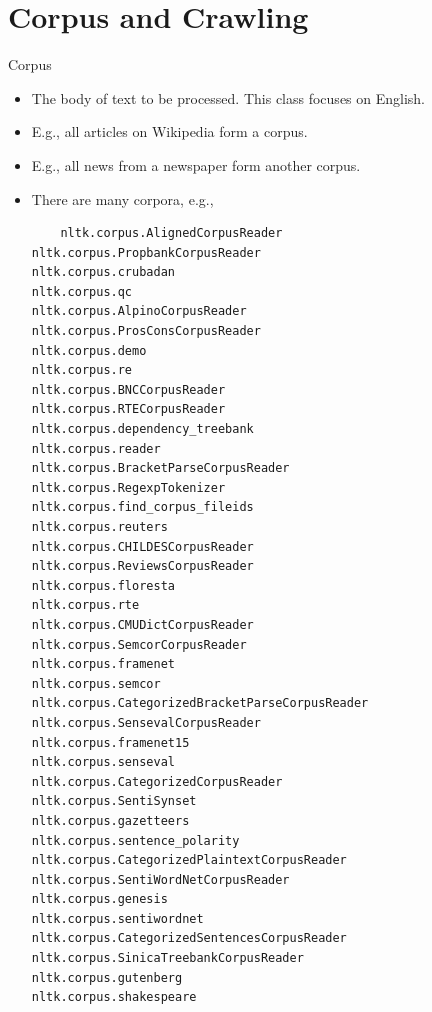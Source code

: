 \documentclass[11pt]{beamer}
\begin{document}
\section{Corpus and Crawling}

\begin{frame}[fragile]{Corpus}
 \begin{itemize}
  \item The body of text to be processed. This class focuses on English. 
  \item E.g., all articles on Wikipedia form a corpus. 
  \item E.g., all news from a newspaper form another corpus. 
  \item There are many corpora, e.g., 
  
{\tiny
   \begin{verbatim}
    nltk.corpus.AlignedCorpusReader                         nltk.corpus.PropbankCorpusReader                        nltk.corpus.crubadan                                    nltk.corpus.qc
nltk.corpus.AlpinoCorpusReader                          nltk.corpus.ProsConsCorpusReader                        nltk.corpus.demo                                        nltk.corpus.re
nltk.corpus.BNCCorpusReader                             nltk.corpus.RTECorpusReader                             nltk.corpus.dependency_treebank                         nltk.corpus.reader
nltk.corpus.BracketParseCorpusReader                    nltk.corpus.RegexpTokenizer                             nltk.corpus.find_corpus_fileids                         nltk.corpus.reuters
nltk.corpus.CHILDESCorpusReader                         nltk.corpus.ReviewsCorpusReader                         nltk.corpus.floresta                                    nltk.corpus.rte
nltk.corpus.CMUDictCorpusReader                         nltk.corpus.SemcorCorpusReader                          nltk.corpus.framenet                                    nltk.corpus.semcor
nltk.corpus.CategorizedBracketParseCorpusReader         nltk.corpus.SensevalCorpusReader                        nltk.corpus.framenet15                                  nltk.corpus.senseval
nltk.corpus.CategorizedCorpusReader                     nltk.corpus.SentiSynset                                 nltk.corpus.gazetteers                                  nltk.corpus.sentence_polarity
nltk.corpus.CategorizedPlaintextCorpusReader            nltk.corpus.SentiWordNetCorpusReader                    nltk.corpus.genesis                                     nltk.corpus.sentiwordnet
nltk.corpus.CategorizedSentencesCorpusReader            nltk.corpus.SinicaTreebankCorpusReader                  nltk.corpus.gutenberg                                   nltk.corpus.shakespeare

\end{verbatim}}
\end{itemize}
\end{frame}
\end{document}
